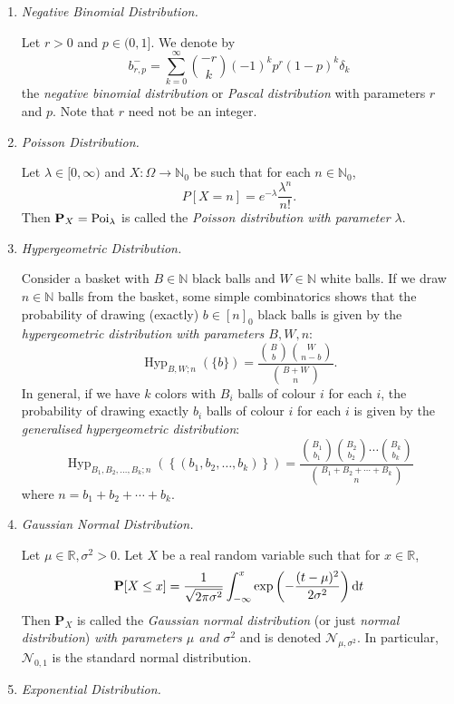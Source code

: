 \begin{enumerate}
    \item \textit{Negative Binomial Distribution.}
    
    Let $r>0$ and $p\in(0,1]$. We denote by
    $$b^{-}_{r,p}=\sum_{k=0}^\infty \binom{-r}{k}(-1)^kp^r(1-p)^k\delta_k$$
    the \textit{negative binomial distribution} or \textit{Pascal distribution} with parameters $r$ and $p$. Note that $r$ need not be an integer.
    
    \item \textit{Poisson Distribution.}
    
    Let $\lambda\in[0,\infty)$ and $X:\Omega\to\mathbb{N}_0$ be such that for each $n\in\mathbb{N}_0$,
    $$P[X=n]=e^{-\lambda}\frac{\lambda^n}{n!}.$$
    Then $\textbf{P}_X=\operatorname{Poi}_\lambda$ is called the \textit{Poisson distribution with parameter $\lambda$}.
    
    \item \textit{Hypergeometric Distribution.}
    
    Consider a basket with $B\in\mathbb{N}$ black balls and $W\in\mathbb{N}$ white balls. If we draw $n\in\mathbb{N}$ balls from the basket, some simple combinatorics shows that the probability of drawing (exactly) $b\in[n]_0$ black balls is given by the \textit{hypergeometric distribution with parameters $B,W,n$}:
    $$\operatorname{Hyp}_{B,W;n}(\{b\})=\frac{\binom{B}{b}\binom{W}{n-b}}{\binom{B+W}{n}}.$$
    In general, if we have $k$ colors with $B_i$ balls of colour $i$ for each $i$, the probability of drawing exactly $b_i$ balls of colour $i$ for each $i$ is given by the \textit{generalised hypergeometric distribution}:
    $$\operatorname{Hyp}_{B_1,B_2,\ldots,B_k;n}(\left\{(b_1,b_2,\ldots,b_k)\right\}) = \frac{\binom{B_1}{b_1}\binom{B_2}{b_2}\cdots\binom{B_k}{b_k}}{\binom{B_1+B_2+\cdots+B_k}{n}}$$
    where $n=b_1+b_2+\cdots+b_k$.
    
    \item \textit{Gaussian Normal Distribution.}
    
    Let $\mu\in\mathbb{R}, \sigma^2>0$. Let $X$ be a real random variable such that for $x\in\mathbb{R}$,
    $$\textbf{P}[X\leq x]=\frac{1}{\sqrt{2\pi\sigma^2}}\int_{-\infty}^x \exp\left(-\frac{(t-\mu)^2}{2\sigma^2}\right)\operatorname{d}\!{t}$$
    Then $\textbf{P}_X$ is called the \textit{Gaussian normal distribution} (or just \textit{normal distribution}) \textit{with parameters $\mu$ and $\sigma^2$} and is denoted $\mathcal{N}_{\mu,\sigma^2}$. In particular, $\mathcal{N}_{0,1}$ is the standard normal distribution. 
    
    \item \textit{Exponential Distribution.}
    

\end{enumerate}
